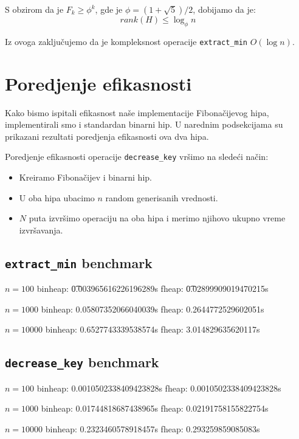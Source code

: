\documentclass[a4paper]{article}
\theoremstyle{plain}
\theoremstyle{definition}
\begin{document}
S obzirom da je $F_{k} \geq \phi^{k}$, gde je $\phi = (1 + \sqrt{5}) / 2$, dobijamo da je:
$$rank(H) \leq \log_{\phi}{n} $$

Iz ovoga zaklju\v{c}ujemo da je kompleksnost operacije \texttt{extract\_min} $O(\log{n})$.

\section{Poredjenje efikasnosti}
\label{sec:Exp}
Kako bismo ispitali efikasnost na\v{s}e implementacije Fibona\v{c}ijevog hipa, implementirali smo i standardan binarni hip. U narednim podsekcijama su prikazani rezultati poredjenja efikasnosti ova dva hipa.

Poredjenje efikasnosti operacije \texttt{decrease\_key} vr\v{s}imo na slede\'{c}i na\v{c}in:
\begin{itemize}
    \item Kreiramo Fibona\v{c}ijev i binarni hip.
    \item U oba hipa ubacimo $n$ random generisanih vrednosti.
    \item $N$ puta izvr\v{s}imo operaciju na oba hipa i merimo njihovo ukupno vreme izvr\v{s}avanja.
\end{itemize}

\subsection{\texttt{extract\_min} benchmark}
\label{subsec:ExpExtractMin}
$n = 100$
binheap: \t0.003965616226196289s
fheap: \t0.02899909019470215s

$n = 1000$
binheap: 0.05807352066040039s
fheap: 0.2644772529602051s

$n = 10000$
binheap: 0.6527743339538574s
fheap: 3.014829635620117s

\subsection{\texttt{decrease\_key} benchmark}
\label{subsec:ExpDecreaseKey}
$n = 100$
binheap: 0.0010502338409423828s
fheap: 0.0010502338409423828s

$n = 1000$
binheap: 0.01744818687438965s
fheap: 0.02191758155822754s

$n = 10000$
binheap: 0.2323460578918457s
fheap: 0.293259859085083s

\appendix



\end{document}

